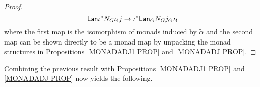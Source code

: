 \documentclass[a4paper,10pt]{article}%
\begin{document}
\begin{proof}
\[	\mathsf{Lan} \iota^{\**} N_G \iota_! j  \to
	\iota^{\**} \mathsf{Lan}_G  N_G  j_G \iota_!
\]
where the first map is the isomorphism of monads induced by $\tilde{\alpha}$ and the second map can be shown directly to be a monad map by unpacking the monad structures in 
Propositions \ref{MONADADJ1 PROP} and \ref{MONADADJ PROP}.
\end{proof}

Combining the previous result with
Propositions \ref{MONADADJ1 PROP} and \ref{MONADADJ PROP} now yields the following.
\end{document}
